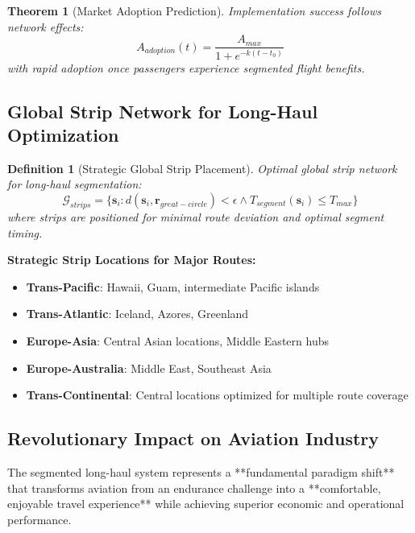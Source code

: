 \documentclass[12pt,a4paper]{article}
\newtheorem{theorem}{Theorem}
\newtheorem{definition}{Definition}
\begin{document}
\begin{theorem}[Market Adoption Prediction]
Implementation success follows network effects:
\begin{equation}
A_{adoption}(t) = \frac{A_{max}}{1 + e^{-k(t-t_0)}}
\end{equation}
with rapid adoption once passengers experience segmented flight benefits.
\end{theorem}

\subsection{Global Strip Network for Long-Haul Optimization}

\begin{definition}[Strategic Global Strip Placement]
Optimal global strip network for long-haul segmentation:
\begin{equation}
\mathcal{G}_{strips} = \{\mathbf{s}_i : d(\mathbf{s}_i, \mathbf{r}_{great-circle}) < \epsilon \land T_{segment}(\mathbf{s}_i) \leq T_{max}\}
\end{equation}
where strips are positioned for minimal route deviation and optimal segment timing.
\end{definition}

\textbf{Strategic Strip Locations for Major Routes:}
\begin{itemize}
\item \textbf{Trans-Pacific}: Hawaii, Guam, intermediate Pacific islands
\item \textbf{Trans-Atlantic}: Iceland, Azores, Greenland
\item \textbf{Europe-Asia}: Central Asian locations, Middle Eastern hubs
\item \textbf{Europe-Australia}: Middle East, Southeast Asia
\item \textbf{Trans-Continental}: Central locations optimized for multiple route coverage
\end{itemize}

\subsection{Revolutionary Impact on Aviation Industry}

The segmented long-haul system represents a **fundamental paradigm shift** that transforms aviation from an endurance challenge into a **comfortable, enjoyable travel experience** while achieving superior economic and operational performance.
\end{document}
